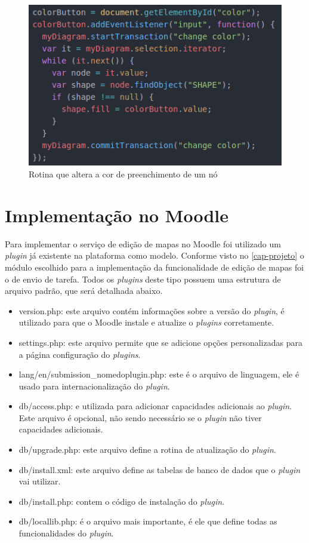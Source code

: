 \documentclass[
	12pt,				%
	openright,			%
	oneside,			%
	a4paper,			%
	english,			%
	french,				%
	spanish,			%
	brazil				%
	]{abntex2}
\begin{document}
\begin{figure}[htb]
	\caption{\label{fig_listener} Rotina que altera a cor de preenchimento de um nó}
	\begin{center}
		\includegraphics[scale=0.6]{listener.png}
	\end{center}
\end{figure}




\section{Implementação no Moodle} 
Para implementar o serviço de edição de mapas no Moodle foi utilizado um \textit{plugin} já existente na plataforma como modelo. Conforme visto no \autoref{cap-projeto} o módulo escolhido para a implementação da funcionalidade de edição de mapas foi o de envio de tarefa. Todos os \textit{plugins} deste tipo possuem uma estrutura de arquivo padrão, que será detalhada abaixo.
\begin{itemize}
	\item version.php: este arquivo contém informações sobre a versão do \textit{plugin}, é utilizado para que o Moodle instale e atualize o \textit{plugins} corretamente.
	\item settings.php: este arquivo permite que se adicione opções personalizadas para a página configuração do \textit{plugins}.
	\item lang/en/submission\_nomedoplugin.php:  este é o arquivo de linguagem, ele é usado para internacionalização do \textit{plugin}.
	\item db/access.php: e utilizada para adicionar capacidades adicionais ao \textit{plugin}. Este arquivo é opcional, não sendo necessário se o \textit{plugin} não tiver capacidades adicionais.
	\item db/upgrade.php: este arquivo define a rotina de atualização do \textit{plugin}. 
	\item db/install.xml: este arquivo define as tabelas de banco de dados que o \textit{plugin} vai utilizar. 
	\item db/install.php: contem o código de instalação do \textit{plugin}.
	\item db/locallib.php: é o arquivo mais importante, é ele que define todas as funcionalidades do \textit{plugin}.    
\end{itemize} 
\end{document}

